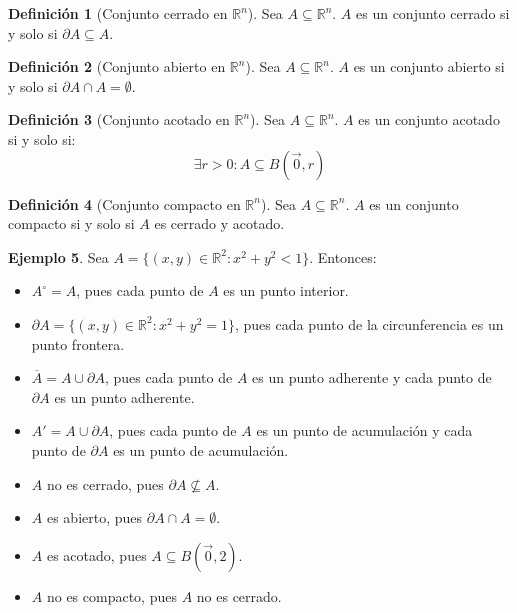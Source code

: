 \documentclass{article}
\newcommand{\R}{\mathbb{R}}
\newcommand{\vect}[1]{\vec{#1}}
\theoremstyle{definition}
\newtheorem{definition}{Definición}[section]
\newtheorem{example}[definition]{Ejemplo}
\theoremstyle{plain}
\theoremstyle{remark}
\theoremstyle{corollary}
\begin{document}
\begin{definition}[Conjunto cerrado en $\R^n$]

Sea $A \subseteq \R^n$. $A$ es un conjunto cerrado si y solo si $\partial A \subseteq A$.

\end{definition}

\begin{definition}[Conjunto abierto en $\R^n$]

Sea $A \subseteq \R^n$. $A$ es un conjunto abierto si y solo si $\partial A \cap A = \emptyset$.

\end{definition}

\begin{definition}[Conjunto acotado en $\R^n$]
Sea $A \subseteq \R^n$. $A$ es un conjunto acotado si y solo si:
\[
\exists r > 0 : A \subseteq B(\vect{0}, r)
\]
\end{definition}

\begin{definition}[Conjunto compacto en $\R^n$]
Sea $A \subseteq \R^n$. $A$ es un conjunto compacto si y solo si $A$ es cerrado y acotado.
\end{definition}

\begin{example}

Sea $A = \{ (x, y) \in \R^2 : x^2 + y^2 < 1 \}$. Entonces:

\begin{itemize}
\item $A^\circ = A$, pues cada punto de $A$ es un punto interior.
\item $\partial A = \{ (x, y) \in \R^2 : x^2 + y^2 = 1 \}$, pues cada punto de la circunferencia es un punto frontera.
\item $\overline{A} = A \cup \partial A$, pues cada punto de $A$ es un punto adherente y cada punto de $\partial A$ es un punto adherente.
\item $A' = A \cup \partial A$, pues cada punto de $A$ es un punto de acumulación y cada punto de $\partial A$ es un punto de acumulación.
\item $A$ no es cerrado, pues $\partial A \not\subseteq A$.
\item $A$ es abierto, pues $\partial A \cap A = \emptyset$.
\item $A$ es acotado, pues $A \subseteq B(\vect{0}, 2)$.
\item $A$ no es compacto, pues $A$ no es cerrado.
\end{itemize}

\end{example}
\end{document}
